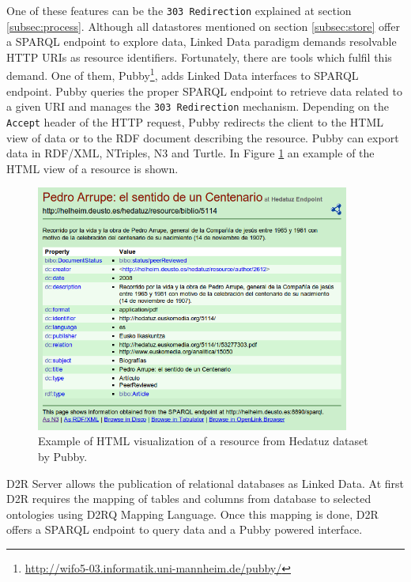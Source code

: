 One of these features can be the \texttt{303 Redirection} explained at section \ref{subsec:process}. Although all datastores mentioned on section \ref{subsec:store} offer a SPARQL endpoint to explore data, Linked Data paradigm demands resolvable HTTP URIs as resource identifiers. Fortunately, there are tools which fulfil this demand. One of them, Pubby\footnote{\url{http://wifo5-03.informatik.uni-mannheim.de/pubby/}}, adds Linked Data interfaces to SPARQL endpoint. Pubby queries the proper SPARQL endpoint to retrieve data related to a given URI and manages the \texttt{303 Redirection} mechanism. Depending on the \texttt{Accept} header of the HTTP request, Pubby redirects the client to the HTML view of data or to the RDF document describing the resource. Pubby can export data in RDF/XML, NTriples, N3 and Turtle. In Figure \ref{fig:pubby} an example of the HTML view of a resource is shown.

\begin{figure}
    \center
    \includegraphics[width=0.92\textwidth]{img/ld_approach/pubby.png}
    \caption{Example of HTML visualization of a resource from Hedatuz dataset by Pubby.}
    \label{fig:pubby}
\end{figure}

D2R Server \cite{bizer2006d2r} allows the publication of relational databases as Linked Data. At first D2R requires the mapping of tables and columns from database to selected ontologies using D2RQ Mapping Language. Once this mapping is done, D2R offers a SPARQL endpoint to query data and a Pubby powered interface.

